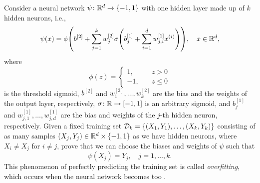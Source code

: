 \begin{exercise}
Consider a neural network $\psi \colon \R^d \to \set{-1, 1}$ with one hidden layer made up of $k$ hidden neurons, i.e.,
\[
    \psi(x) = \phi\left(b^{[2]} + \sum_{j=1}^k w_{j}^{[2]} \sigma\left(b_{j}^{[1]} + \sum_{i=1}^d w_{j, i}^{[1]} x^{(i)} \right)\right), \quad x \in \R^d,
\]
where
\[
    \phi(z) = \begin{cases}
        1, \quad & z > 0 \\
        -1, \quad & z \leq 0
    \end{cases}
\]
is the threshold sigmoid, $b^{[2]}$ and $w_1^{[2]}, \dots, w_k^{[2]}$ are the bias and the weights of the output layer, respectively, $\sigma \colon \mathbb{R} \to [-1, 1]$ is an arbitrary sigmoid, and $b_j^{[1]}$ and $w_{j, 1}^{[1]}, \dots, w_{j, d}^{[1]}$ are the bias and weights of the $j$-th hidden neuron, respectively. Given a fixed training set $\mathcal{D}_k = \set{(X_1, Y_1), \dots, (X_k, Y_k)}$ consisting of as many samples $(X_j, Y_j) \in \R^d \times \set{-1, 1}$ as we have hidden neurons, where $X_i \neq X_j$ for $i \neq j$, prove that we can choose the biases and weights of $\psi$ such that
\[
    \psi(X_j) = Y_j, \quad j = 1, \dots, k.
\]
This phenomenon of perfectly predicting the training set is called \emph{overfitting}, which occurs when the neural network becomes too .
\end{exercise}
